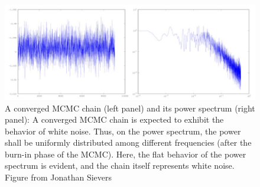 \documentclass[12pt, TexShade, letterpaper]{report}
\begin{document}
\begin{figure}[h!]
\centering
\includegraphics[scale =0.9]{mcmc_converged.jpg}
\caption[A converged MCMC chain and its power spectrum]{A converged MCMC chain (left panel) and its power spectrum (right panel): A converged MCMC chain is expected to exhibit the behavior of white noise. Thus, on the power spectrum, the power shall be uniformly distributed among different frequencies (after the burn-in phase of the MCMC). Here, the flat behavior of the power spectrum is evident, and the chain itself represents white noise. Figure from Jonathan Sievers}
\label{fig:MCMC_converged}
\end{figure}

\end{document}
